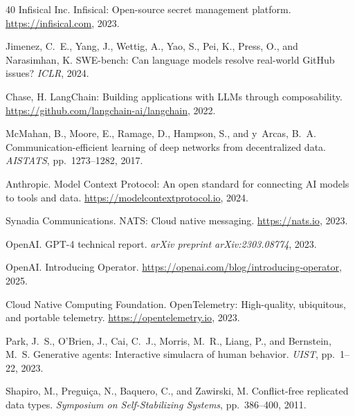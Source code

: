 \begin{thebibliography}{40}
Infisical Inc.
\newblock Infisical: Open-source secret management platform.
\newblock \url{https://infisical.com}, 2023.

Jimenez, C.~E., Yang, J., Wettig, A., Yao, S., Pei, K., Press, O., and
  Narasimhan, K.
\newblock SWE-bench: Can language models resolve real-world GitHub issues?
\newblock \emph{ICLR}, 2024.

Chase, H.
\newblock LangChain: Building applications with LLMs through composability.
\newblock \url{https://github.com/langchain-ai/langchain}, 2022.

McMahan, B., Moore, E., Ramage, D., Hampson, S., and y~Arcas, B.~A.
\newblock Communication-efficient learning of deep networks from decentralized
  data.
\newblock \emph{AISTATS}, pp.\ 1273--1282, 2017.

Anthropic.
\newblock Model Context Protocol: An open standard for connecting AI models
  to tools and data.
\newblock \url{https://modelcontextprotocol.io}, 2024.

Synadia Communications.
\newblock NATS: Cloud native messaging.
\newblock \url{https://nats.io}, 2023.

OpenAI.
\newblock GPT-4 technical report.
\newblock \emph{arXiv preprint arXiv:2303.08774}, 2023.

OpenAI.
\newblock Introducing Operator.
\newblock \url{https://openai.com/blog/introducing-operator}, 2025.

Cloud Native Computing Foundation.
\newblock OpenTelemetry: High-quality, ubiquitous, and portable telemetry.
\newblock \url{https://opentelemetry.io}, 2023.

Park, J.~S., O'Brien, J., Cai, C.~J., Morris, M.~R., Liang, P., and
  Bernstein, M.~S.
\newblock Generative agents: Interactive simulacra of human behavior.
\newblock \emph{UIST}, pp.\ 1--22, 2023.

Shapiro, M., Pregui{\c{c}}a, N., Baquero, C., and Zawirski, M.
\newblock Conflict-free replicated data types.
\newblock \emph{Symposium on Self-Stabilizing Systems}, pp.\ 386--400, 2011.


\end{thebibliography}
